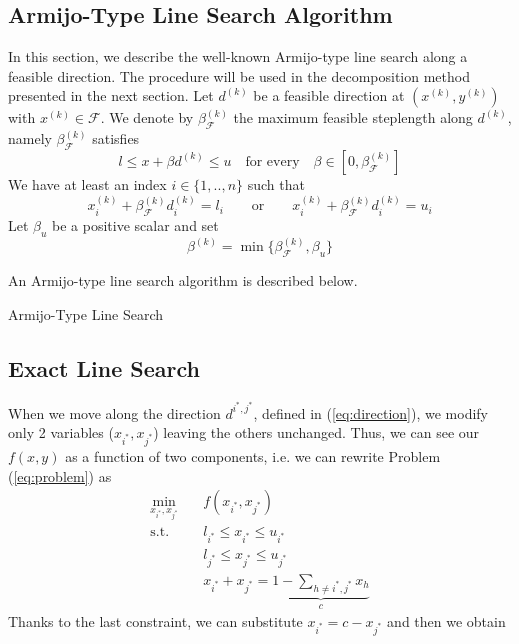 \subsection{Armijo-Type Line Search Algorithm}
In this section, we describe the well-known Armijo-type line search along a feasible direction. The procedure will be used in the decomposition method presented in the next section. Let $d^{(k)}$ be a feasible direction at $(x^{(k)}, y^{(k)})$ with $x^{(k)} \in \mathcal{F}$. We denote by $\beta_{\mathcal{F}}^{(k)}$ the maximum feasible steplength along $d^{(k)}$, namely $\beta_{\mathcal{F}}^{(k)}$ satisfies
\begin{equation*}
l \leq x + \beta d^{(k)} \leq u \quad \text{for every} \quad \beta \in [ 0, \beta_{\mathcal{F}}^{(k)} ]
\end{equation*}
We have at least an index $i \in \{1, .., n\}$ such that
\begin{equation*}
x_i^{(k)} + \beta_{\mathcal{F}}^{(k)} d_i^{(k)} = l_i \qquad \text{or} \qquad x_i^{(k)} + \beta_{\mathcal{F}}^{(k)} d_i^{(k)} = u_i 
\end{equation*}
Let $\beta_u$ be a positive scalar and set
\begin{equation}
\beta^{(k)} = \min \{\beta_{\mathcal{F}}^{(k)}, \beta_u\}
\end{equation}

\hspace{-1.8em}An Armijo-type line search algorithm is described below.\\
\begin{algorithm}
 \caption{Armijo-Type Line Search}
\end{algorithm}

\subsection{Exact Line Search}
When we move along the direction $d^{i^*,j^*}$, defined in (\ref{eq:direction}), we modify only 2 variables ($x_{i^*}, x_{j^*}$) leaving the others unchanged. Thus, we can see our $f(x,y)$ as a function of two components, i.e. we can rewrite Problem (\ref{eq:problem}) as
\begin{subequations}\label{eq:twocomp} 
\begin{align}
\min_{x_{i^*}, x_{j^*}} & \quad f(x_{i^*}, x_{j^*})  \\
\text{s.t.} & \quad l_{i^*} \leq x_{i^*}  \leq u_{i^*} \\
& \quad l_{j^*} \leq x_{j^*}  \leq u_{j^*} \\
& \quad x_{i^*}+x_{j^*} = \underbrace{1-\sum_{h\ne {i^*},{j^*}}x_h}_c
\end{align}
\end{subequations}
Thanks to the last constraint, we can substitute $x_{i^*} = c - x_{j^*}$ and then we obtain

